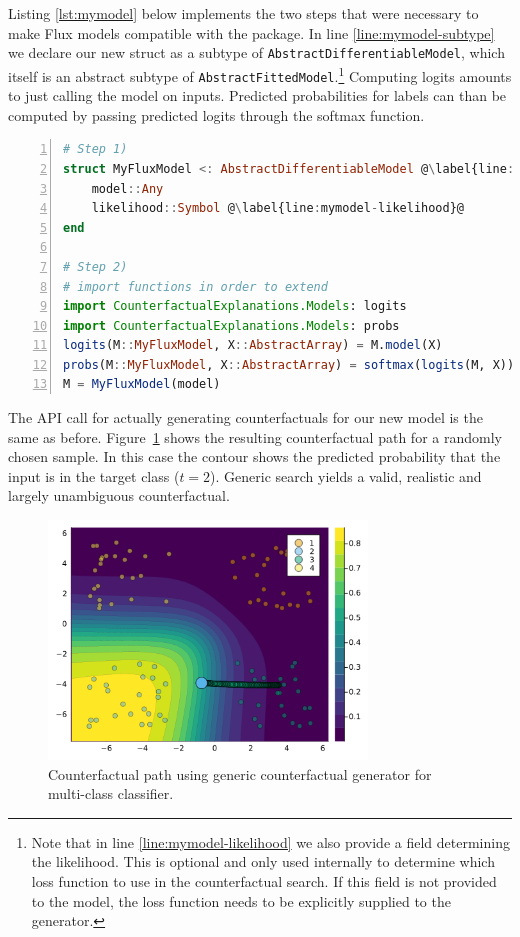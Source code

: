 \documentclass[
  letterpaper,
  DIV=11,
  numbers=noendperiod]{scrartcl}
\begin{document}
Listing \ref{lst:mymodel} below implements the two steps that were
necessary to make Flux models compatible with the package. In line
\ref{line:mymodel-subtype} we declare our new struct as a subtype of
\texttt{AbstractDifferentiableModel}, which itself is an abstract
subtype of \texttt{AbstractFittedModel}.\footnote{Note that in line
  \ref{line:mymodel-likelihood} we also provide a field determining the
  likelihood. This is optional and only used internally to determine
  which loss function to use in the counterfactual search. If this field
  is not provided to the model, the loss function needs to be explicitly
  supplied to the generator.} Computing logits amounts to just calling
the model on inputs. Predicted probabilities for labels can than be
computed by passing predicted logits through the softmax function.

\begin{lstlisting}[language=Julia, escapechar=@, numbers=left, label={lst:mymodel}, caption={}]
# Step 1)
struct MyFluxModel <: AbstractDifferentiableModel @\label{line:mymodel-subtype}@
    model::Any
    likelihood::Symbol @\label{line:mymodel-likelihood}@
end

# Step 2)
# import functions in order to extend
import CounterfactualExplanations.Models: logits
import CounterfactualExplanations.Models: probs 
logits(M::MyFluxModel, X::AbstractArray) = M.model(X)
probs(M::MyFluxModel, X::AbstractArray) = softmax(logits(M, X))
M = MyFluxModel(model)
\end{lstlisting}

The API call for actually generating counterfactuals for our new model
is the same as before. Figure~\ref{fig-multi} shows the resulting
counterfactual path for a randomly chosen sample. In this case the
contour shows the predicted probability that the input is in the target
class (\(t=2\)). Generic search yields a valid, realistic and largely
unambiguous counterfactual.

\begin{figure}

{\centering \includegraphics[width=3.33333in,height=2.5in]{www/ce_multi.png}

}

\caption{\label{fig-multi}Counterfactual path using generic
counterfactual generator for multi-class classifier.}

\end{figure}
\end{document}
